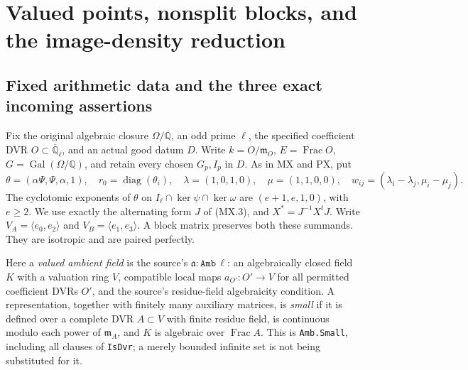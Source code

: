 \section{Valued points, nonsplit blocks, and the image-density reduction}
\label{sec:symplectic-image-density}


\subsection{Fixed arithmetic data and the three exact incoming assertions}

Fix the original algebraic closure $\Omega/\mathbb Q$, an odd
prime $\ell$, the specified coefficient DVR
$O\subset\overline{\mathbb Q}_\ell$, and an actual good datum
$D$.  Write $k=O/\mathfrak m_O$, $E=\operatorname{Frac}O$,
$G=\operatorname{Gal}(\Omega/\mathbb Q)$, and retain every
chosen $G_p,I_p$ in $D$.  As in MX and PX, put
\[
 \theta=(\alpha\Psi,\Psi,\alpha,1),\quad
 r_0=\operatorname{diag}(\theta_i),\quad
 \lambda=(1,0,1,0),\quad \mu=(1,1,0,0),\quad
 w_{ij}=(\lambda_i-\lambda_j,\mu_i-\mu_j).
 \tag{IX.1}
\]
The cyclotomic exponents of $\theta$ on
$I_\ell\cap\ker\psi\cap\ker\omega$ are
$(e+1,e,1,0)$, with $e\ge2$.  We use exactly the alternating
form $J$ of (MX.3), and $X^*=J^{-1}X^tJ$.
Write $V_A=\langle e_0,e_2\rangle$ and
$V_B=\langle e_1,e_3\rangle$.  A block matrix preserves both
these summands.  They are isotropic and are paired perfectly.

Here a \emph{valued ambient field} is the source's
$\mathfrak a:\texttt{Amb}\,\ell$: an algebraically closed field
$K$ with a valuation ring $V$, compatible local maps
$a_{O'}:O'\to V$ for all permitted coefficient DVRs $O'$, and
the source's residue-field algebraicity condition.  A
representation, together with finitely many auxiliary matrices,
is \emph{small} if it is defined over a complete DVR $A\subset V$
with finite residue field, is continuous modulo each power of
$\mathfrak m_A$, and $K$ is algebraic over
$\operatorname{Frac}A$.  This is \texttt{Amb.Small}, including
all clauses of \texttt{IsDvr}; a merely bounded infinite set is
not being substituted for it.

